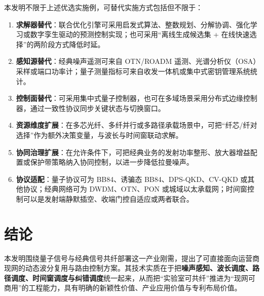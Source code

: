 \documentclass[12pt,a4paper]{article}
\begin{document}
本发明不限于上述优选实施例，可替代实施方式包括但不限于：
\begin{enumerate}[label=(\arabic*)]
    \item \textbf{求解器替代}：联合优化引擎可采用启发式算法、整数规划、分解协调、强化学习或数字孪生驱动的预测控制实现；也可采用“离线生成候选集 + 在线快速选择”的两阶段方式降低时延。
    \item \textbf{感知源替代}：经典噪声遥测可来自 OTN/ROADM 遥测、光谱分析仪（OSA）采样或端口功率计；量子测量指标可来自收发一体机或集中式密钥管理系统统计。
    \item \textbf{控制面替代}：可采用集中式量子控制器，也可在多域场景采用分布式边缘控制器，通过一致性协议同步关键状态与切换窗口。
    \item \textbf{资源维度扩展}：在多芯光纤、多纤并行或多路径承载场景中，可把“纤芯/纤对选择”作为额外决策变量，与波长与时间窗联动求解。
    \item \textbf{协同治理扩展}：在允许条件下，可把经典业务的发射功率整形、放大器增益配置或保护带策略纳入协同控制，以进一步降低拉曼噪声。
    \item \textbf{协议适配}：量子协议可为 BB84、诱骗态 BB84、DPS-QKD、CV-QKD 或其他协议；经典网络可为 DWDM、OTN、PON 或城域以太承载网；时间窗控制可以是发射端静默插空、收端门控自适应或两者联合。
\end{enumerate}

\section{结论}

本发明围绕量子信号与经典信号共纤部署这一产业刚需，提出了可直接面向运营商现网的动态波分复用与路由控制方案。其技术实质在于把\textbf{噪声感知、波长调度、路径调度、时间窗调度与纠错调度}统一起来，从而把“实验室可共纤”推进为“现网可商用”的工程能力，具有明确的新颖性价值、产业应用价值与专利布局价值。
\end{document}
